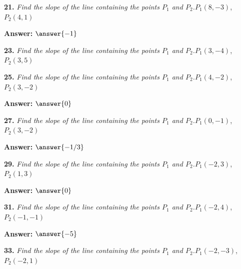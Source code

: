\documentclass{ximera}
\begin{document}
\begin{problem}
\textbf{21.} \emph{Find the slope of the line containing the points $P_1$ and $P_2$.}\quad $P_1(8, -3)$, $P_2(4, 1)$

\textbf{Answer:} $\answer{-1}$
\end{problem}

\begin{problem}
\textbf{23.} \emph{Find the slope of the line containing the points $P_1$ and $P_2$.}\quad $P_1(3, -4)$, $P_2(3, 5)$

\begin{multipleChoice}
\end{multipleChoice}

\end{problem}

\begin{problem}
\textbf{25.} \emph{Find the slope of the line containing the points $P_1$ and $P_2$.}\quad $P_1(4, -2)$, $P_2(3, -2)$

\textbf{Answer:} $\answer{0}$
\end{problem}

\begin{problem}
\textbf{27.} \emph{Find the slope of the line containing the points $P_1$ and $P_2$.}\quad $P_1(0, -1)$, $P_2(3, -2)$

\textbf{Answer:} $\answer{-1/3}$
\end{problem}

\begin{problem}
\textbf{29.} \emph{Find the slope of the line containing the points $P_1$ and $P_2$.}\quad $P_1(-2, 3)$, $P_2(1, 3)$

\textbf{Answer:} $\answer{0}$
\end{problem}

\begin{problem}
\textbf{31.} \emph{Find the slope of the line containing the points $P_1$ and $P_2$.}\quad $P_1(-2, 4)$, $P_2(-1, -1)$

\textbf{Answer:} $\answer{-5}$
\end{problem}

\begin{problem}
\textbf{33.} \emph{Find the slope of the line containing the points $P_1$ and $P_2$.}\quad $P_1(-2, -3)$, $P_2(-2, 1)$

\begin{multipleChoice}
\end{multipleChoice}

\end{problem}
\end{document}
